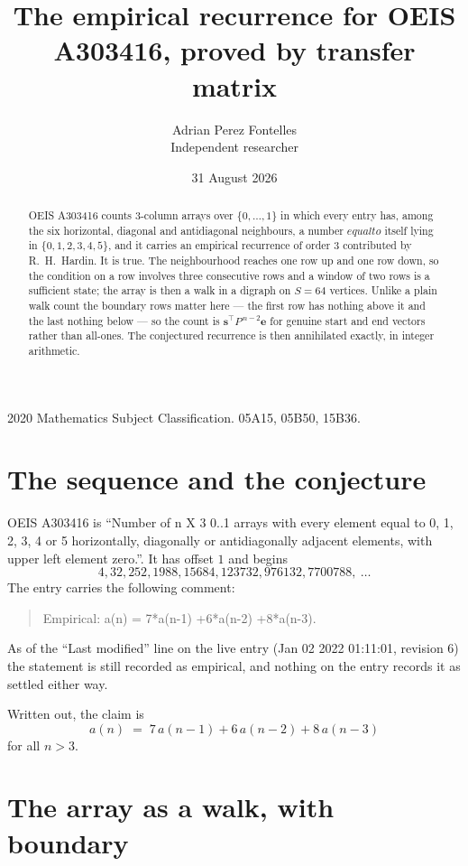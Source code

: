 \documentclass[11pt,a4paper]{article}
\title{The empirical recurrence for OEIS A303416, proved by transfer matrix}
\author{Adrian Perez Fontelles\\ \small Independent researcher}
\date{31 August 2026}
\theoremstyle{plain}
\theoremstyle{definition}
\begin{document}
\maketitle

\begin{abstract}
OEIS A303416 counts $3$-column arrays over $\{0,\dots,1\}$ in which every entry has,
among the six horizontal, diagonal and antidiagonal neighbours, a number $equal to$ itself lying in $\{0,1,2,3,4,5\}$, and it carries an empirical
recurrence of order $3$ contributed by R.~H.~Hardin. It is true. The neighbourhood
reaches one row up and one row down, so the condition on a row involves three consecutive
rows and a window of two rows is a sufficient state; the array is then a walk in a digraph
on $S=64$ vertices. Unlike a plain walk count the boundary rows matter here --- the first
row has nothing above it and the last nothing below --- so the count is
$\mathbf{s}^{\!\top}P^{\,n-2}\mathbf{e}$ for genuine start and end vectors rather than
all-ones. The conjectured recurrence is then annihilated exactly, in integer arithmetic.
\end{abstract}

\noindent\small 2020 Mathematics Subject Classification. 05A15, 05B50, 15B36.\normalsize

\section{The sequence and the conjecture}

OEIS A303416 is ``Number of n X 3 0..1 arrays with every element equal to 0, 1, 2, 3, 4 or 5 horizontally, diagonally or antidiagonally adjacent elements, with upper left element zero.''. It has offset
$1$ and begins
\[
4, 32, 252, 1988, 15684, 123732, 976132, 7700788,\ \dots
\]
The entry carries the following comment:
\begin{quote}\small
Empirical: a(n) = 7*a(n-1) +6*a(n-2) +8*a(n-3).
\end{quote}
As of the ``Last modified'' line on the live entry (Jan 02 2022 01:11:01, revision
6) the statement is still recorded as empirical, and nothing on the entry
records it as settled either way.

Written out, the claim is
\begin{equation}\label{eq:conj}
a(n)\;=\;7\,a(n-1) + 6\,a(n-2) + 8\,a(n-3)
\end{equation}
for all $n>3$.

\section{The array as a walk, with boundary}
\end{document}
